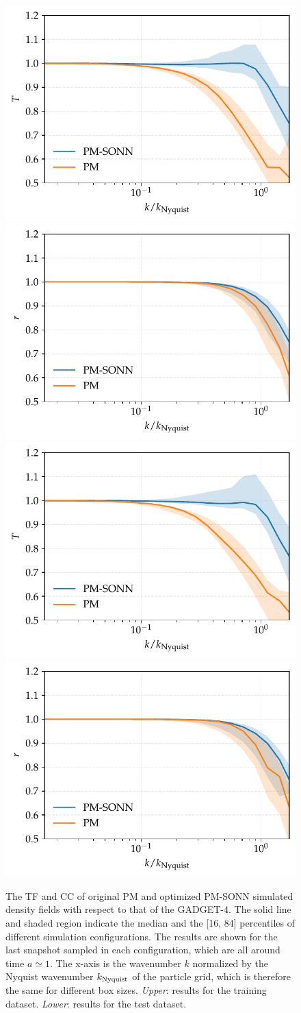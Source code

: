 \documentclass[modern, trackchanges, dvipsnames]{aastex631}
\newcommand{\GADGET}{{{\fontsize{10pt}{12pt}\selectfont GADGET}-4}}
\begin{document}
\begin{figure}
  \centering
  \includegraphics[width=.48\columnwidth]{tf_snap120_3177874_e3000_mid-per.pdf}
  \includegraphics[width=.48\columnwidth]{cc_snap120_3177874_e3000_mid-per.pdf} \\
  \includegraphics[width=.48\columnwidth]{tf_test_snap120_3177874_e3000_mid-per.pdf}
  \includegraphics[width=.48\columnwidth]{cc_test_snap120_3177874_e3000_mid-per.pdf}
  \caption{The TF and CC of original PM and optimized PM-SONN simulated
  density fields with respect to that of the \GADGET.
  The solid line and shaded region indicate the median and the [16, 84]
  percentiles of different simulation configurations.
  The results are shown for the last snapshot sampled in each
  configuration, which are all around time $a\simeq 1$.
  The x-axis is the wavenumber $k$ normalized by the Nyquist wavenumber
  $k_{\rm Nyquist}$ of the particle grid, which is therefore the same
  for different box sizes.
  \textit{Upper}: results for the training dataset.
  \textit{Lower}: results for the test dataset.
  }
  \label{fig:tfcc}
\end{figure}
\end{document}
